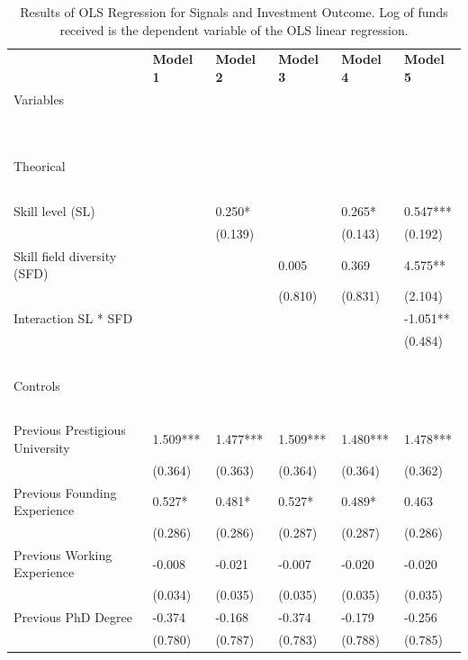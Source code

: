 \documentclass[12pt]{article}
\begin{document}
\clearpage
\begin{table}[!ht]
\scriptsize
    \centering
    \caption{Results of OLS Regression for Signals and Investment Outcome. Log of funds received is the dependent variable of the OLS linear regression.}
    \begin{tabular}{llllll}
        \toprule
        ~ & \textbf{Model 1} & \textbf{Model 2} & \textbf{Model 3} & \textbf{Model 4} & \textbf{Model 5} \\
        Variables & ~ & ~ & ~ & ~ & ~ \\
        ~ & ~ & ~ & ~ & ~ & ~ \\
        \midrule
        ~ & ~ & ~ & ~ & ~ & ~ \\
        Theorical & ~ & ~ & ~ & ~ & ~ \\
        & ~ & ~ & ~ & ~ & ~ \\
        Skill level (SL) & ~ & 0.250* & ~ & 0.265* & 0.547*** \\
        ~ & ~ & (0.139) & ~ & (0.143) & (0.192) \\
        Skill field diversity (SFD) & ~ & ~ & 0.005 & 0.369 & 4.575** \\
        ~ & ~ & ~ & (0.810) & (0.831) & (2.104) \\
        Interaction SL * SFD & ~ & ~ & ~ & ~ & -1.051** \\
        ~ & ~ & ~ & ~ & ~ & (0.484) \\
        ~ & ~ & ~ & ~ & ~ & ~ \\
        Controls & ~ & ~ & ~ & ~ & ~ \\
        & ~ & ~ & ~ & ~ & ~ \\
        Previous Prestigious University & 1.509*** & 1.477*** & 1.509*** & 1.480*** & 1.478*** \\
        ~ & (0.364) & (0.363) & (0.364) & (0.364) & (0.362) \\
        Previous Founding Experience & 0.527* & 0.481* & 0.527* & 0.489* & 0.463 \\
        ~ & (0.286) & (0.286) & (0.287) & (0.287) & (0.286) \\
        Previous Working Experience & -0.008 & -0.021 & -0.007 & -0.020 & -0.020 \\
        ~ & (0.034) & (0.035) & (0.035) & (0.035) & (0.035) \\
        Previous PhD Degree & -0.374 & -0.168 & -0.374 & -0.179 & -0.256 \\
        ~ & (0.780) & (0.787) & (0.783) & (0.788) & (0.785) \\

\end{tabular}
\end{table}
\end{document}
